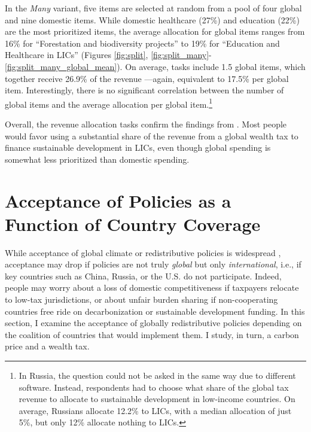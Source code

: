 \documentclass[12pt,english]{article}
\begin{document}
In the \textit{Many} variant, five items are selected at random from a pool of four global and nine domestic items. While domestic healthcare (27\%) %
and education (22\%) %
are the most prioritized items, the average allocation for global items ranges from 16\% %
for ``Forestation and biodiversity projects'' to 19\% %
for ``Education and Healthcare in LICs'' (Figures \ref{fig:split}, \ref{fig:split_many}-\ref{fig:split_many_global_mean}). On average, tasks include 1.5 global items, which together receive 26.9\% of the revenue ---again, equivalent to 17.5\% per global item. Interestingly, there is no significant correlation between the number of global items and the average allocation per global item.\footnote{In Russia, the question could not be asked in the same way due to different software. Instead, respondents had to choose what share of the global tax revenue to allocate to sustainable development in low-income countries. On average, Russians allocate 12.2\% to LICs, with a median allocation of just 5\%, but only 12\% allocate nothing to LICs.} %

Overall, the revenue allocation tasks confirm the findings from \cite{fabre_majority_2025}. Most people would favor using a substantial share of the revenue from a global wealth tax to finance sustainable development in LICs, even though global spending is somewhat less prioritized than domestic spending. 


\section{Acceptance of %
Policies as a Function of Country Coverage\label{sec:coverage}}

While acceptance of global climate or redistributive policies is widespread \citep{fabre_majority_2025,cappelen_majority_2025}, acceptance may drop if policies are not truly \textit{global} but only \textit{international}, i.e., if key countries such as China, Russia, or the U.S. do not participate. Indeed, people may worry about a loss of domestic competitiveness if taxpayers relocate to low-tax jurisdictions, or about unfair burden sharing if non-cooperating countries free ride on decarbonization or sustainable development funding. %
In this section, I examine the acceptance of globally redistributive policies depending on the coalition of countries that would implement them. I study, in turn, a carbon price and a wealth tax.
\end{document}
